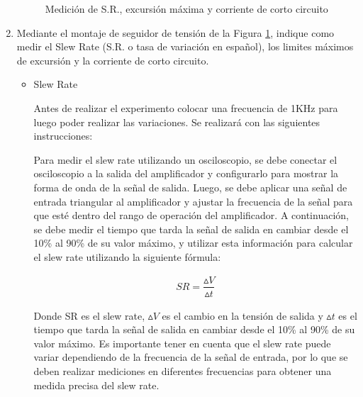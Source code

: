 \begin{enumerate}[label=\textbf{\arabic*.}, font=\bfseries]
\begin{itemize}
        \end{itemize}

    

    \begin{figure}[H]
      \centering
      
      \caption{Medición de S.R., excursión máxima y corriente de corto circuito}
      \label{fig:buffer}
    \end{figure}

    \item Mediante el montaje de seguidor de tensión de la Figura \ref{fig:buffer}, indique como medir el Slew Rate (S.R. o tasa de variación en español), los limites máximos de excursión y la corriente de corto circuito.

        \begin{itemize}
            \item Slew Rate

                Antes de realizar el experimento colocar una frecuencia de 1KHz para luego poder realizar las variaciones. Se realizará con las siguientes instrucciones:
    
                Para medir el slew rate utilizando un osciloscopio, se debe conectar el osciloscopio a la salida del amplificador y configurarlo para mostrar la forma de onda de la señal de salida. Luego, se debe aplicar una señal de entrada triangular al amplificador y ajustar la frecuencia de la señal para que esté dentro del rango de operación del amplificador. A continuación, se debe medir el tiempo que tarda la señal de salida en cambiar desde el 10\% al 90\% de su valor máximo, y utilizar esta información para calcular el slew rate utilizando la siguiente fórmula:
                
                \begin{gather}
                    SR= \dfrac{\vartriangle V}{\vartriangle t} \label{eqn:sr}
                \end{gather}
     
                Donde SR es el slew rate, $\vartriangle V$ es el cambio en la tensión de salida y $\vartriangle t$ es el tiempo que tarda la señal de salida en cambiar desde el 10\% al 90\% de su valor máximo. Es importante tener en cuenta que el slew rate puede variar dependiendo de la frecuencia de la señal de entrada, por lo que se deben realizar mediciones en diferentes frecuencias para obtener una medida precisa del slew rate.
    

\end{itemize}
\end{enumerate}
